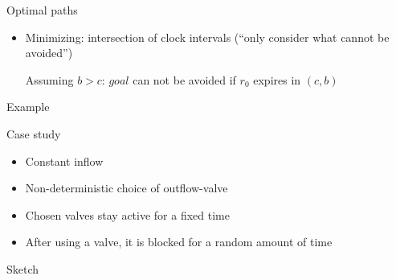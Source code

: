 \documentclass[aspectratio=169]{beamer}
\begin{document}
\begin{frame}{Optimal paths}
\begin{minipage}[t]{.6\linewidth}
{\begin{itemize}
        \item Minimizing: intersection of clock intervals (\enquote{only consider what cannot be avoided})

        {\scriptsize Assuming $b > c$: $\mathit{goal}$ can not be avoided if $r_0$ expires in $(c,b)$}

    \end{itemize}
    }%
  \end{minipage}%
  \begin{minipage}[t]{.4\linewidth}
    Example

    \centering

    \only<2>{}%
    \only<3>{}%
  \end{minipage}%

\end{frame}


\begin{frame}{Case study}
  \begin{minipage}[t]{.6\linewidth}
    \begin{itemize}
      \item Constant inflow
      \item Non-deterministic choice of outflow-valve
      \item Chosen valves stay active for a fixed time
      \item After using a valve, it is blocked for a random amount of time
    \end{itemize}
  \end{minipage}%
  \begin{minipage}[t]{.4\linewidth}
    \centering
    Sketch


    
  \end{minipage}%

\end{frame}

\end{document}
